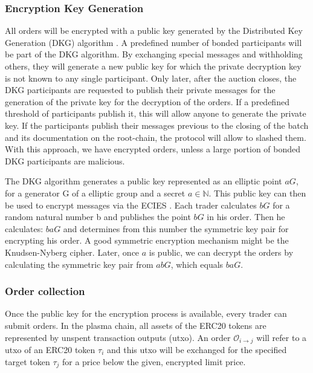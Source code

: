 \documentclass[11pt,parskip=full]{scrartcl}%
\def\pO{\mathcal{O}}
\def\ra{\rightarrow}
\newcommand*{\erc}{ERC20 }
\begin{document}
\subsubsection{Encryption Key Generation}
All orders will be encrypted with a public key generated by the Distributed Key Generation (DKG) algorithm \cite{DKG}. 
A predefined number of bonded participants will be part of the DKG algorithm. 
By exchanging special messages and withholding others, they will generate a new public key for which the private decryption key is not known to any single participant. 
Only later, after the auction closes, the DKG participants are requested to publish their private messages for the generation of the private key for the decryption of the orders.
If a predefined threshold of participants publish it, this will allow anyone to generate the private key. 
If the participants publish their messages previous to the closing of the batch and its documentation on the root-chain, the protocol will allow to slashed them. 
With this approach, we have encrypted orders, unless a large portion of bonded DKG participants are malicious. 

The DKG algorithm generates a public key represented as an elliptic point $aG\label{public key}$, for a generator G of a elliptic group and a secret $a\in \mathbb{N}$. 
This public key can then be used to encrypt messages via the ECIES \cite{ECIES}. 
Each trader calculates $bG \label{salt}$ for a random natural number b and publishes the point $bG$  in his order. 
Then he calculates: $baG$ and determines from this number the symmetric key pair for encrypting his order. 
A good symmetric encryption mechanism might be the Knudsen-Nyberg cipher\cite{cipher}.
Later, once $a$ is public, we can decrypt the orders by calculating the symmetric key pair from $abG$, which equals $baG$. 


\subsubsection{Order collection}
\label{orderblock}
Once the public key for the encryption process is available, every trader can submit orders. 
In the plasma chain, all assets of the ERC20 tokens are represented by unspent transaction outputs (utxo). 
An order $\pO_{i\ra j}$ will refer to a utxo of an \erc token $\tau_i$ and this utxo will be exchanged for the specified target token $\tau_j$ for a price below the given, encrypted limit price. 
\end{document}
